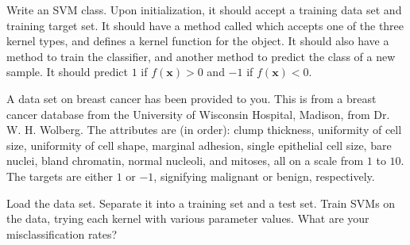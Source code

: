 \begin{problem}
Write an SVM class. Upon initialization, it should accept a training data set and training target set. It should have a method called  which accepts one of the three kernel types, and defines a kernel function for the object. It should also have a method to train the classifier, and another method to predict the class of a new sample. It should predict $1$ if $f(\mathbf{x}) > 0$ and $-1$ if $f(\mathbf{x}) < 0$.
\end{problem}

A data set on breast cancer has been provided to you. This is from a breast cancer database from the University of Wisconsin Hospital, Madison, from Dr. W. H. Wolberg. The attributes are (in order): clump thickness, uniformity of cell size, uniformity of cell shape, marginal adhesion, single epithelial cell size, bare nuclei, bland chromatin, normal nucleoli, and mitoses, all on a scale from $1$ to $10$. The targets are either $1$ or $-1$, signifying malignant or benign, respectively.

\begin{problem}
Load the data set. Separate it into a training set and a test set. Train SVMs on the data, trying each kernel with various parameter values. What are your misclassification rates?
\end{problem}
